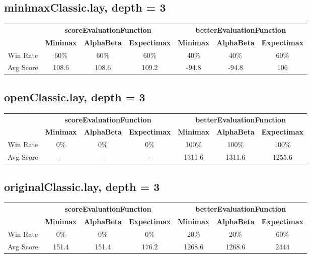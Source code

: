 \documentclass[english, a4paper,12pt]{article}
\begin{document}
\subsection*{minimaxClassic.lay, depth = 3}
\small\begin{tabular}{|c|c|c|c|c|c|c|}
\hline
\text{ } & \multicolumn{3}{c|}{\textbf{scoreEvaluationFunction}} & \multicolumn{3}{c|}{\textbf{betterEvaluationFunction}} \\
\cline{2-7}
& \textbf{Minimax} & \textbf{AlphaBeta} & \textbf{Expectimax} & \textbf{Minimax} & \textbf{AlphaBeta} & \textbf{Expectimax} \\
\hline
Win Rate & 60\% & 60\% & 60\% & 40\% & 40\% & 60\%\\
Avg Score & 108.6 & 108.6 & 109.2 & -94.8 & -94.8 & 106\\ 
\hline
\end{tabular}

\subsection*{openClassic.lay, depth = 3}
\small\begin{tabular}{|c|c|c|c|c|c|c|}
\hline
\text{ } & \multicolumn{3}{c|}{\textbf{scoreEvaluationFunction}} & \multicolumn{3}{c|}{\textbf{betterEvaluationFunction}} \\
\cline{2-7}
& \textbf{Minimax} & \textbf{AlphaBeta} & \textbf{Expectimax} & \textbf{Minimax} & \textbf{AlphaBeta} & \textbf{Expectimax} \\
\hline
Win Rate & 0\% & 0\% & 0\% & 100\% & 100\% & 100\%\\
Avg Score & - & - & - & 1311.6 & 1311.6 & 1255.6\\ 
\hline
\end{tabular}

\subsection*{originalClassic.lay, depth = 3}
\small\begin{tabular}{|c|c|c|c|c|c|c|}
\hline
\text{ } & \multicolumn{3}{c|}{\textbf{scoreEvaluationFunction}} & \multicolumn{3}{c|}{\textbf{betterEvaluationFunction}} \\
\cline{2-7}
& \textbf{Minimax} & \textbf{AlphaBeta} & \textbf{Expectimax} & \textbf{Minimax} & \textbf{AlphaBeta} & \textbf{Expectimax} \\
\hline
Win Rate & 0\% & 0\% & 0\% & 20\% & 20\% & 60\%\\
Avg Score & 151.4 & 151.4 & 176.2 & 1268.6 & 1268.6 & 2444\\ 
\hline
\end{tabular}
\end{document}
